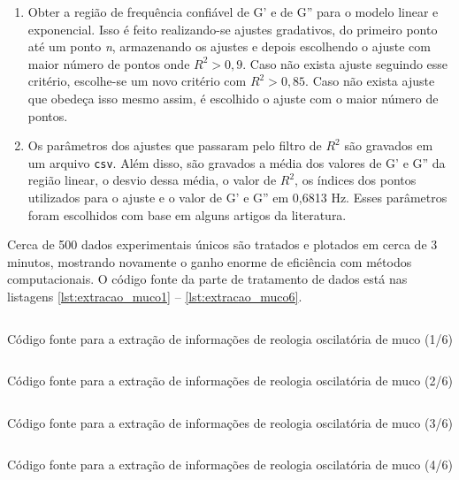 		\begin{enumerate}
			\item Obter a região de frequência confiável de G' e de G'' para o modelo linear e exponencial. Isso é feito realizando-se ajustes gradativos, do primeiro ponto até um ponto \emph{n}, armazenando os ajustes e depois escolhendo o ajuste com maior número de pontos onde \(R^2 > 0{,}9\). Caso não exista ajuste seguindo esse critério, escolhe-se um novo critério com \(R^2 > 0,85\). Caso não exista ajuste que obedeça isso mesmo assim, é escolhido o ajuste com o maior número de pontos. 
			\item Os parâmetros dos ajustes que passaram pelo filtro de \(R^2\) são gravados em um arquivo \texttt{csv}. Além disso, são gravados a média dos valores de G' e G'' da região linear, o desvio dessa média, o valor de \(R^2\), os índices dos pontos utilizados para o ajuste e o valor de G' e G'' em 0,6813 Hz. Esses parâmetros foram escolhidos com base em alguns artigos da literatura. %
		\end{enumerate}
		
		Cerca de 500 dados experimentais únicos são tratados e plotados em cerca de 3 minutos, mostrando novamente o ganho enorme de eficiência com métodos computacionais. O código fonte da parte de tratamento de dados está nas listagens \ref{lst:extracao_muco1} -- \ref{lst:extracao_muco6}.
		
		\begin{listing}[h]
			\inputminted{python}{./python/extracao_muco1.py}
			\caption{Código fonte para a extração de informações de reologia oscilatória de muco (1/6)} 
			\label{lst:extracao_muco1}
		\end{listing}
		
		\begin{listing}[h]
			\inputminted{python}{./python/extracao_muco2.py}
			\caption{Código fonte para a extração de informações de reologia oscilatória de muco (2/6)} 
			\label{lst:extracao_muco2}
		\end{listing}
		
		\begin{listing}[h]
			\inputminted{python}{./python/extracao_muco3.py}
			\caption{Código fonte para a extração de informações de reologia oscilatória de muco (3/6)} 
			\label{lst:extracao_muco3}
		\end{listing}
		
		\begin{listing}[h]
			\inputminted{python}{./python/extracao_muco4.py}
			\caption{Código fonte para a extração de informações de reologia oscilatória de muco (4/6)} 
			\label{lst:extracao_muco4}
		\end{listing}
		
